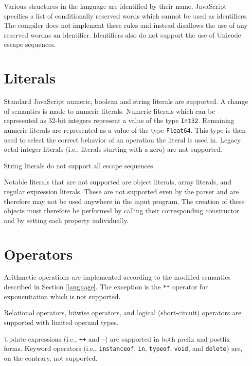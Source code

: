 Various structures in the language are identified by their name. JavaScript specifies a list of conditionally reserved words which cannot be used as identifiers. The compiler does not implement these rules and instead disallows the use of any reserved word\footnotemark[1] as an identifier. Identifiers also do not support the use of Unicode escape sequences.



\section{Literals}

Standard JavaScript numeric, boolean and string literals are supported. A change of semantics is made to numeric literals. Numeric literals which can be represented as 32-bit integers represent a value of the type \texttt{Int32}. Remaining numeric literals are represented as a value of the type \texttt{Float64}. This type is then used to select the correct behavior of an operation the literal is used in. Legacy octal integer literals (i.e., literals starting with a zero) are not supported.

String literals do not support all escape sequences.

Notable literals that are not supported are object literals, array literals, and regular expression literals. These are not supported even by the parser and are therefore may not be used anywhere in the input program. The creation of these objects must therefore be performed by calling their corresponding constructor and by setting each property individually.


\section{Operators}

Arithmetic operations are implemented according to the modified semantics described in Section \ref{language}. The exception is the \texttt{**} operator for exponentiation which is not supported.

Relational operators, bitwise operators, and logical (short-circuit) operators are supported with limited operand types.

Update expressions (i.e., \texttt{++} and \texttt{--}) are supported in both prefix and postfix forms. Keyword operators (i.e., \texttt{instanceof}, \texttt{in}, \texttt{typeof}, \texttt{void}, and \texttt{delete}) are, on the contrary, not supported.

